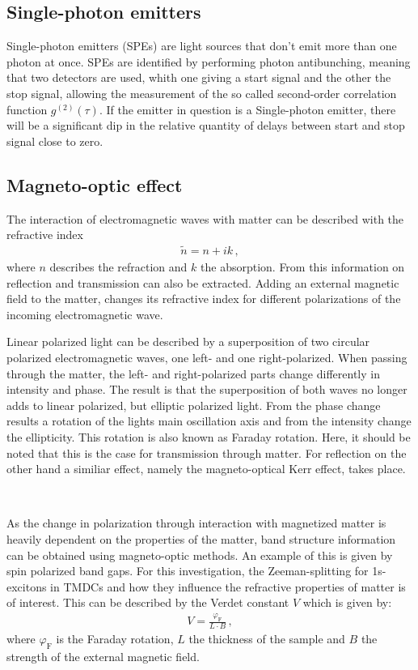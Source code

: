 \subsection{Single-photon emitters}
\label{sec:theory:spe}

Single-photon emitters (SPEs) are light sources that don't emit more than one photon at once.
SPEs are identified by performing photon antibunching, meaning that two detectors are used, whith one giving a start signal and the other the stop signal, allowing the measurement of the so called second-order correlation function $g^{(2)}(\tau)$.
If the emitter in question is a Single-photon emitter, there will be a significant dip in the relative quantity of delays between start and stop signal close to zero.

\subsection{Magneto-optic effect}

	The interaction of electromagnetic waves with matter can be described with the refractive index
	\begin{align*}
		\tilde{n} = n + ik \,,
	\end{align*}
	where $n$ describes the refraction and $k$ the absorption.
	From this information on reflection and transmission can also be extracted.
	Adding an external magnetic field to the matter, changes its refractive index for different polarizations of the incoming electromagnetic wave.

  Linear polarized light can be described by a superposition of two circular polarized electromagnetic waves, one left- and one right-polarized.
	When passing through the matter, the left- and right-polarized parts change differently in intensity and phase.
	The result is that the superposition of both waves no longer adds to linear polarized, but elliptic polarized light.
	From the phase change results a rotation of the lights main oscillation axis and from the intensity change the ellipticity.
	This rotation is also known as Faraday rotation.
	Here, it should be noted that this is the case for transmission through matter.
  For reflection on the other hand a similiar effect, namely the magneto-optical Kerr effect, takes place.

	\

	As the change in polarization through interaction with magnetized matter is heavily dependent on the properties of the matter, band structure information can be obtained using magneto-optic methods.
	An example of this is given by spin polarized band gaps.
	For this investigation, the Zeeman-splitting for 1s-excitons in TMDCs and how they influence the refractive properties of matter is of interest.
	This can be described by the Verdet constant $V$ which is given by:
	\begin{align*}
		V = \frac{\varphi_\text{F}}{L\cdot B} \,,
	\end{align*}
	where $\varphi_\text{F}$ is the Faraday rotation, $L$ the thickness of the sample and $B$ the strength of the external magnetic field.

